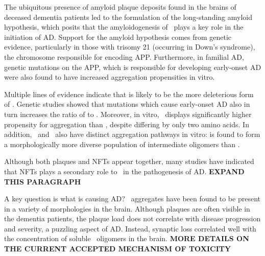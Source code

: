 The ubiquitous presence of amyloid plaque deposits found in the brains of deceased dementia patients led to the formulation of the long-standing amyloid hypothesis, which posits that the amyloidogenesis of \abeta\ plays a key role in the initiation of AD.\cite{Hardy:2002dh} Support for the amyloid hypothesis comes from genetic evidence, particularly in those with trisomy 21 (occurring in Down's syndrome), the chromosome responsible for encoding APP. Furthermore, in familial AD, genetic mutations on the APP, which is responsible for developing early-onset AD were also found to have increased aggregation propensities in vitro. %

Multiple lines of evidence indicate that \abetafortytwo is likely to be the more deleterious form of \abeta. Genetic studies showed that mutations which cause early-onset AD also in turn increases the ratio of \abetafortytwo to \abetaforty.\cite{Hardy:1997tu} Moreover, in vitro, \abetafortytwo\ displays significantly higher propensity for aggregation than \abetaforty, despite differing by only two amino acids. In addition, \abetaforty\ and \abetafortytwo\ also have distinct aggregation pathways in vitro: \abetafortytwo is found to form a morphologically more diverse population of intermediate oligomers than \abetaforty.\cite{Bitan:2003ut} %

Although both plaques and NFTs appear together, many studies have indicated that NFTs plays a secondary role to \abeta\ in the pathogenesis of AD.\cite{XXX} \textbf{EXPAND THIS PARAGRAPH} %


A key question is what is causing AD? \abeta\ aggregates have been found to be present in a variety of morphologies in the brain. Although plaques are often visible in the dementia patients, the plaque load does not correlate with disease progression and severity, a puzzling aspect of AD.  Instead, synaptic loss correlated well with the concentration of soluble \abeta\ oligomers in the brain. \textbf{MORE DETAILS ON THE CURRENT ACCEPTED MECHANISM OF TOXICITY}


